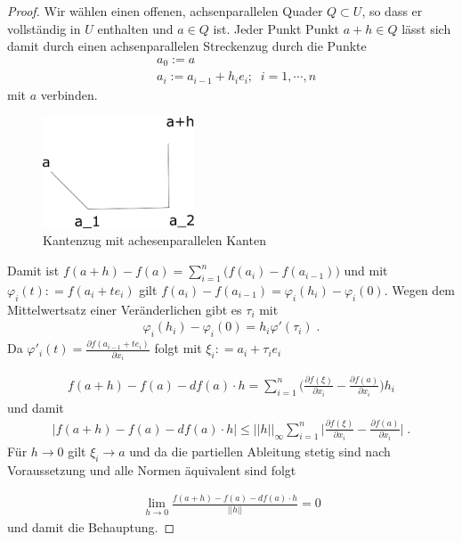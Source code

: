 \begin{proof}
Wir wählen einen offenen, achsenparallelen Quader $Q \subset U$, so dass er vollständig in $U$ enthalten und $a \in Q$ ist.
Jeder Punkt Punkt $a + h \in Q$  lässt sich damit durch einen achsenparallelen Streckenzug durch die Punkte
\begin{align*}
& a_0 := a \\
& a_i  := a_{i-1} + h_i e_i;  \;  \;  i = 1, \cdots , n
\end{align*} 
mit $a$ verbinden. 
\begin{figure}[H]
      \centering
    \includegraphics[width=0.4\textwidth]{images/kantenzug}
      \caption{Kantenzug mit achesenparallelen Kanten}
\end{figure}

Damit ist $f(a + h) - f(a) = \sum_{i=1}^{n} \bigl( f (a_i)   - f(a_{i-1})   \bigr)$ und  mit $\varphi_i(t) : = f(a_i + t e_i)$ gilt 
$f(a_i) - f(a_{i-1}) = \varphi_i(h_i)  - \varphi_i(0)$. Wegen dem Mittelwertsatz einer Veränderlichen gibt  es  $\tau_i$  mit
\begin{align*}
\varphi_i(h_i)  - \varphi_i(0)  = h_i \varphi'(\tau_i) \;.
\end{align*} 
Da $\varphi'_i(t) = \frac{\partial  f(a_{i-1} + t e_i ) }{\partial x_i}$ folgt mit $\xi_i: = a_i + \tau_i e_i$ 

\begin{align*}
f(a + h) - f(a) - df(a) \cdot h = \sum_{i=1}^n  \biggl( \frac{\partial  f(\xi) }{\partial x_i} -    \frac{\partial  f(a) }{\partial x_i}   \biggr) h_i
\end{align*} 
und damit
\begin{align*}
| f(a + h) - f(a) - df(a) \cdot h |  \leq || h ||_{\infty}  \sum_{i=1}^n  \biggl| \frac{\partial  f(\xi) }{\partial x_i} -    \frac{\partial  f(a) }{\partial x_i}   \biggr | \; . 
\end{align*} 
Für $h \to 0$ gilt $\xi_i \to a$ und da die partiellen Ableitung stetig sind nach Voraussetzung und alle Normen äquivalent sind folgt

\begin{align*}
\lim_{h \to 0} \frac{ f(a + h) - f(a) - df(a) \cdot h}{||h||} = 0 
\end{align*} 
und damit die Behauptung.
\end{proof}

